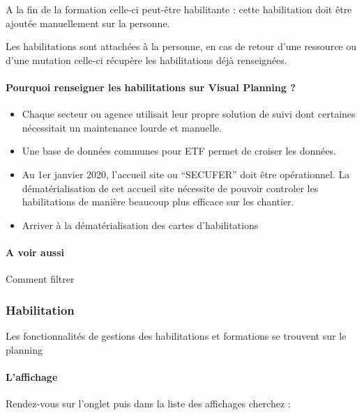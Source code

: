 \documentclass[letterpaper,10pt,english]{sphinxmanual}
\begin{document}
A la fin de la formation celle-ci peut-être habilitante : cette habilitation doit être ajoutée manuellement sur la personne.

Les habilitations sont attachées à la personne, en cas de retour d’une ressource ou d’une mutation celle-ci récupère les habilitations déjà renseignées.


\paragraph{Pourquoi renseigner les habilitations sur Visual Planning ?}
\label{\detokenize{fonctionnalitees/habilitation_formation:pourquoi-renseigner-les-habilitations-sur-visual-planning}}\begin{itemize}
\item {} 
Chaque secteur ou agence utilisait leur propre solution de suivi dont certaines nécessitait un maintenance lourde et manuelle.

\item {} 
Une base de données communes pour ETF permet de croiser les données.

\item {} 
Au 1er janvier 2020, l’accueil site ou “SECUFER” doit être opérationnel. La dématérialisation de cet accueil site nécessite de pouvoir controler les habilitations de manière beaucoup plus efficace sur les chantier.

\item {} 
Arriver à la dématérialisation des cartes d’habilitations

\end{itemize}


\paragraph{A voir aussi}
\label{\detokenize{fonctionnalitees/habilitation_formation:a-voir-aussi}}
Comment filtrer


\subsubsection{Habilitation}
\label{\detokenize{fonctionnalitees/habilitation_formation:habilitation}}
Les fonctionnalités de gestions des habilitations et formations se trouvent sur le planning 


\paragraph{L’affichage}
\label{\detokenize{fonctionnalitees/habilitation_formation:l-affichage}}
Rendez-vous sur l’onglet  puis dans la liste des affichages cherchez : 
\end{document}
